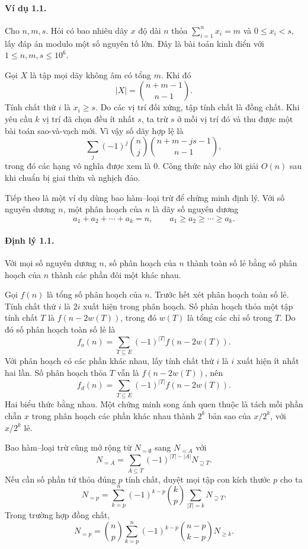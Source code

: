 \documentclass[11pt]{article}
\begin{document}
\paragraph{Ví dụ 1.1.}
Cho \(n,m,s\). Hỏi có bao nhiêu dãy \(x\) độ dài \(n\) thỏa
\(\sum_{i=1}^n x_i=m\) và \(0\le x_i<s\), lấy đáp án modulo một số nguyên tố
lớn. Đây là bài toán kinh điển với \(1\le n,m,s\le 10^6\).

Gọi \(X\) là tập mọi dãy không âm có tổng \(m\). Khi đó
\[
|X|=\binom{n+m-1}{n-1}.
\]
Tính chất thứ \(i\) là \(x_i\ge s\). Do các vị trí đối xứng, tập tính chất là
đồng chất. Khi yêu cầu \(k\) vị trí đã chọn đều ít nhất \(s\), ta trừ \(s\) ở
mỗi vị trí đó và thu được một bài toán sao-và-vạch mới. Vì vậy số dãy hợp lệ là
\[
\sum_j (-1)^j\binom nj
\binom{n+m-js-1}{n-1},
\]
trong đó các hạng vô nghĩa được xem là \(0\). Công thức này cho lời giải
\(O(n)\) sau khi chuẩn bị giai thừa và nghịch đảo.

Tiếp theo là một ví dụ dùng bao hàm--loại trừ để chứng minh định lý. Với số
nguyên dương \(n\), một phân hoạch của \(n\) là dãy số nguyên dương
\[
a_1+a_2+\cdots+a_k=n,\qquad a_1\ge a_2\ge\cdots\ge a_k.
\]

\paragraph{Định lý 1.1.}
Với mọi số nguyên dương \(n\), số phân hoạch của \(n\) thành toàn số lẻ bằng số
phân hoạch của \(n\) thành các phần đôi một khác nhau.

Gọi \(f(n)\) là tổng số phân hoạch của \(n\). Trước hết xét phân hoạch toàn số
lẻ. Tính chất thứ \(i\) là \(2i\) xuất hiện trong phân hoạch. Số phân hoạch
thỏa một tập tính chất \(T\) là \(f(n-2w(T))\), trong đó \(w(T)\) là tổng các
chỉ số trong \(T\). Do đó số phân hoạch toàn số lẻ là
\[
f_o(n)=\sum_{T\subseteq E}(-1)^{|T|}f(n-2w(T)).
\]
Với phân hoạch có các phần khác nhau, lấy tính chất thứ \(i\) là \(i\) xuất hiện
ít nhất hai lần. Số phân hoạch thỏa \(T\) vẫn là \(f(n-2w(T))\), nên
\[
f_d(n)=\sum_{T\subseteq E}(-1)^{|T|}f(n-2w(T)).
\]
Hai biểu thức bằng nhau. Một chứng minh song ánh quen thuộc là tách mỗi phần
chẵn \(x\) trong phân hoạch các phần khác nhau thành \(2^k\) bản sao của
\(x/2^k\), với \(x/2^k\) lẻ.

Bao hàm--loại trừ cũng mở rộng từ \(N_{=\emptyset}\) sang \(N_{=A}\) với
\[
N_{=A}=\sum_{A\subseteq T}(-1)^{|T|-|A|}N_{\supseteq T}.
\]
Nếu cần số phần tử thỏa đúng \(p\) tính chất, duyệt mọi tập con kích thước
\(p\) cho ta
\[
N_{=p}=\sum_{k=p}^n(-1)^{k-p}\binom kp
\sum_{|T|=k}N_{\supseteq T}.
\]
Trong trường hợp đồng chất,
\[
N_{=p}=\binom np\sum_{k=p}^n(-1)^{k-p}\binom{n-p}{k-p}N_{\ge k}.
\]
\end{document}
